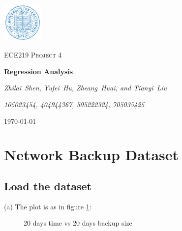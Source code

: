 \documentclass{article}
\begin{document}
\begin{titlepage}
	\centering
	\includegraphics[width=0.15\textwidth]{UCLA.png}\par\vspace{1cm}
	\vspace{1cm}
	{\scshape\Large ECE219 Project 4 \par}
	\vspace{1.5cm}
	{\huge\bfseries Regression Analysis\par}
	\vspace{2cm}
	{\Large\itshape Zhilai~Shen, Yufei~Hu, Zheang~Huai, and Tianyi~Liu\par}
	{\Large\itshape 105023454, 404944367, 505222324, 705035425\par}
	\vfill

	\vfill

	{\large \today\par}
\end{titlepage}

\tableofcontents

\newpage

\section{Network Backup Dataset}

\subsection{Load the dataset}
(a) The plot is as in figure \ref{1a}:

\begin{figure}[!htbp]
\centering
{}
\caption{20 days time vs 20 days backup size} \label{1a}
\end{figure}
\end{document}
